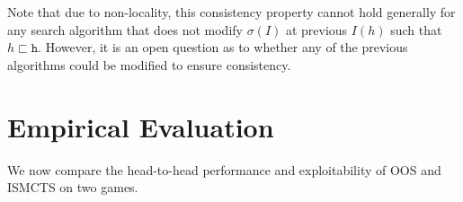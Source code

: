 \documentclass[letterpaper]{article}
\newcommand{\tth}{\mathtt{h}}
\newcounter{mlNoteCounter}
\newcommand{\mlnote}[1]{{\scriptsize \color{darkgreen} $\blacksquare$ \refstepcounter{mlNoteCounter}\textsf{[ML]$_{\arabic{mlNoteCounter}}$:{#1}}}}
\begin{document}
Note that due to non-locality, this consistency property cannot hold generally for any search 
algorithm that does not modify $\sigma(I)$ at previous $I(h)$ such that $h \sqsubset \tth$. However, 
it is an open question as to whether any of the previous algorithms could be modified to ensure 
consistency.

\section{Empirical Evaluation}


%

We now compare the head-to-head performance and exploitability 
of OOS and ISMCTS on two games. %
\end{document}
